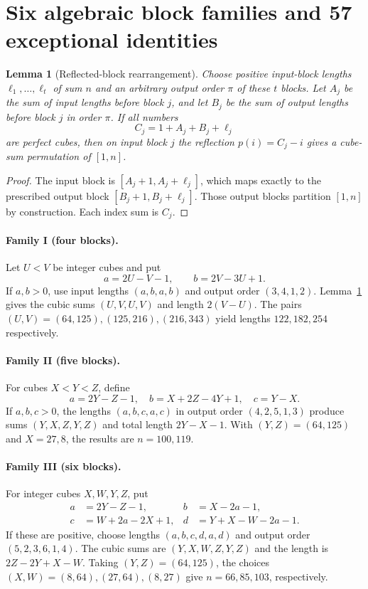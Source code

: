 \documentclass[10pt]{article}
\newtheorem{lemma}{Lemma}
\begin{document}
\section{Six algebraic block families and 57 exceptional identities}

\begin{lemma}[Reflected-block rearrangement]\label{lem:rearrange}
Choose positive input-block lengths
$\ell_1,\ldots,\ell_t$ of sum $n$ and an arbitrary
output order $\pi$ of these $t$ blocks.
Let $A_j$ be the sum of input lengths before
block $j$, and let $B_j$ be the sum of output
lengths before block $j$ in order $\pi$.
If all numbers
\[
  C_j=1+A_j+B_j+\ell_j
\]
are perfect cubes, then on input block $j$
the reflection $p(i)=C_j-i$ gives a cube-sum
permutation of $[1,n]$.
\end{lemma}
\begin{proof}
The input block is $[A_j+1,A_j+\ell_j]$,
which maps exactly to the prescribed output
block $[B_j+1,B_j+\ell_j]$.
Those output blocks partition $[1,n]$
by construction. Each index sum is $C_j$.
\end{proof}

\paragraph{Family I (four blocks).}
Let $U<V$ be integer cubes and put
\[
a=2U-V-1,\qquad b=2V-3U+1.
\]
If $a,b>0$, use input lengths $(a,b,a,b)$
and output order $(3,4,1,2)$.
Lemma~\ref{lem:rearrange} gives the cubic
sums $(U,V,U,V)$ and length $2(V-U)$.
The pairs $(U,V)=(64,125),(125,216),(216,343)$
yield lengths $122,182,254$ respectively.

\paragraph{Family II (five blocks).}
For cubes $X<Y<Z$, define
\[
a=2Y-Z-1,\quad
b=X+2Z-4Y+1,\quad c=Y-X.
\]
If $a,b,c>0$, the lengths $(a,b,c,a,c)$
in output order $(4,2,5,1,3)$ produce
sums $(Y,X,Z,Y,Z)$ and total length
$2Y-X-1$. With $(Y,Z)=(64,125)$ and
$X=27,8$, the results are $n=100,119$.

\paragraph{Family III (six blocks).}
For integer cubes $X,W,Y,Z$, put
\[
\begin{aligned}
a&=2Y-Z-1,& b&=X-2a-1,\\
c&=W+2a-2X+1,& d&=Y+X-W-2a-1.
\end{aligned}
\]
If these are positive, choose lengths
$(a,b,c,d,a,d)$ and output order
$(5,2,3,6,1,4)$. The cubic sums are
$(Y,X,W,Z,Y,Z)$ and the length is
$2Z-2Y+X-W$. Taking $(Y,Z)=(64,125)$,
the choices $(X,W)=(8,64),(27,64),(8,27)$
give $n=66,85,103$, respectively.
\end{document}
